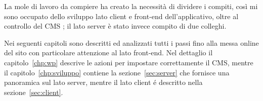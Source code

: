 La mole di lavoro da compiere ha creato la necessità di dividere i compiti, così mi sono occupato dello sviluppo lato client e front-end dell'applicativo, oltre al controllo del CMS {\wp}; il lato server è stato invece compito di due colleghi.

Nei seguenti capitoli sono descritti ed analizzati tutti i passi fino alla messa online del sito con particolare attenzione al lato front-end. Nel dettaglio il capitolo~\ref{chp:wp} descrive le azioni per impostare correttamente il CMS, mentre il capitolo~\ref{chp:sviluppo} contiene la sezione~\ref{sec:server} che fornisce una panoramica sul lato server, mentre il lato client é descritto nella sezione~\ref{sec:client}.
